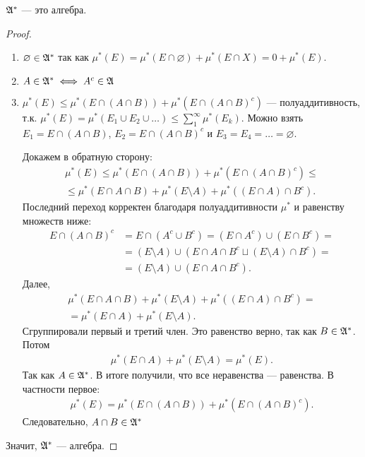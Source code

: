 \begin{lm}
 $ \mathfrak{A}^\ast $ --- это алгебра.
\end{lm}
\begin{proof}\
 \begin{enumerate}
  \item $ \varnothing \in \mathfrak{A}^\ast $ так как $ \mu^\ast(E) = \mu^\ast(E \cap \varnothing) + \mu^\ast(E \cap X) = 0 + \mu^\ast(E) $.
   \setcounter{enumi}{2}
  \item $ A \in \mathfrak{A}^\ast \iff A^c \in \mathfrak{A} $
   \setcounter{enumi}{1}
  \item $ \mu^\ast(E) \leqslant \mu^\ast(E \cap (A \cap B)) + \mu^\ast(E \cap (A \cap B)^c) $ --- полуаддитивность, т.к. $ \mu^\ast(E) = \mu^\ast(E_1 \cup E_2 \cup \ldots) \leqslant \sum_1^\infty \mu^\ast(E_k)$. Можно взять $ E_1 = E \cap (A \cap B) $, $ E_2 = E \cap (A \cap B)^c $ и $ E_3 = E_4 = \ldots = \varnothing $.

   Докажем в обратную сторону:
   \begin{align*}
     \mu^\ast(E) \leqslant \mu^\ast(E \cap (A \cap B)) + \mu^\ast(E \cap (A \cap B)^c) \leqslant \\
     \leqslant \mu^\ast(E \cap A \cap B) + \mu^\ast(E \setminus A) + \mu^\ast((E \cap A) \cap B^c)
   .\end{align*} Последний переход корректен благодаря полуаддитивности $\mu^*$ и равенству множеств ниже:
   \begin{align*}
    E \cap (A \cap B)^c &= E \cap (A^c \cup B^c) = (E \cap A^c) \cup (E \cap B^c) =\\&= (E \setminus A) \cup (E \cap A \cap B^c \sqcup (E \setminus A) \cap B^c) =\\
    &= (E \setminus A) \cup (E \cap A \cap B^c)
   .\end{align*} Далее,
   \begin{align*}
    \mu^\ast(E \cap A \cap B) + \mu^\ast(E \setminus A) + \mu^\ast((E \cap A) \cap B^c) = \\
    = \mu^\ast(E \cap A) + \mu^\ast(E \setminus A)
   .\end{align*} Сгруппировали первый и третий член. Это равенство верно, так как $ B \in \mathfrak{A}^\ast $. Потом
   \begin{align*}
    \mu^\ast(E \cap A) + \mu^\ast(E \setminus A) = \mu^\ast(E)
   .\end{align*} Так как $ A \in \mathfrak{A}^\ast $. В итоге получили, что все неравенства --- равенства. В частности первое:
   \begin{align*}
    \mu^\ast(E) = \mu^\ast(E \cap (A \cap B)) + \mu^\ast(E \cap (A \cap B)^c)
   .\end{align*} Следовательно, $ A \cap B \in \mathfrak{A}^\ast $
 \end{enumerate} 
 Значит, $ \mathfrak{A}^\ast $ --- алгебра.
\end{proof}
